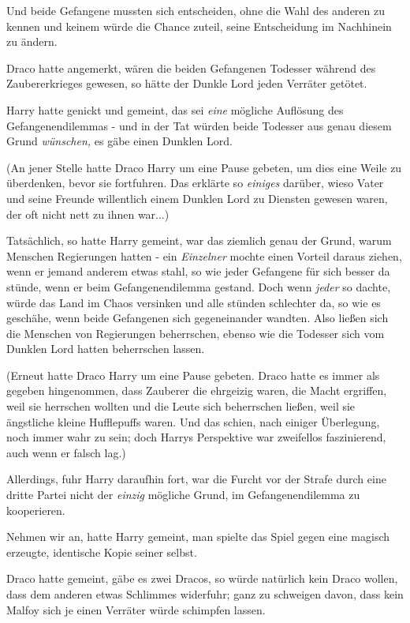 {Und beide Gefangene mussten sich entscheiden, ohne die Wahl des anderen zu kennen und keinem würde die Chance zuteil, seine Entscheidung im Nachhinein zu ändern.

Draco hatte angemerkt, wären die beiden Gefangenen Todesser während des Zaubererkrieges gewesen, so hätte der Dunkle Lord jeden Verräter getötet.

Harry hatte genickt und gemeint, das sei \emph{eine} mögliche Auflösung des Gefangenendilemmas - und in der Tat würden beide Todesser aus genau diesem Grund \emph{wünschen,} es gäbe einen Dunklen Lord.

(An jener Stelle hatte Draco Harry um eine Pause gebeten, um dies eine Weile zu überdenken, bevor sie fortfuhren. Das erklärte so \emph{einiges} darüber, wieso Vater und seine Freunde willentlich einem Dunklen Lord zu Diensten gewesen waren, der oft nicht nett zu ihnen war...)

Tatsächlich, so hatte Harry gemeint, war das ziemlich genau der Grund, warum Menschen Regierungen hatten - ein \emph{Einzelner} mochte einen Vorteil daraus ziehen, wenn er jemand anderem etwas stahl, so wie jeder Gefangene für sich besser da stünde, wenn er beim Gefangenendilemma gestand. Doch wenn \emph{jeder} so dachte, würde das Land im Chaos versinken und alle stünden schlechter da, so wie es geschähe, wenn beide Gefangenen sich gegeneinander wandten. Also ließen sich die Menschen von Regierungen beherrschen, ebenso wie die Todesser sich vom Dunklen Lord hatten beherrschen lassen.

(Erneut hatte Draco Harry um eine Pause gebeten. Draco hatte es immer als gegeben hingenommen, dass Zauberer die ehrgeizig waren, die Macht ergriffen, weil sie herrschen wollten und die Leute sich beherrschen ließen, weil sie ängstliche kleine Hufflepuffs waren. Und das schien, nach einiger Überlegung, noch immer wahr zu sein; doch Harrys Perspektive war zweifellos faszinierend, auch wenn er falsch lag.)

Allerdings, fuhr Harry daraufhin fort, war die Furcht vor der Strafe durch eine dritte Partei nicht der \emph{einzig} mögliche Grund, im Gefangenendilemma zu kooperieren.

Nehmen wir an, hatte Harry gemeint, man spielte das Spiel gegen eine magisch erzeugte, identische Kopie seiner selbst.

Draco hatte gemeint, gäbe es zwei Dracos, so würde natürlich kein Draco wollen, dass dem anderen etwas Schlimmes widerfuhr; ganz zu schweigen davon, dass kein Malfoy sich je einen Verräter würde schimpfen lassen.

}
